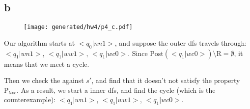 \subsection{b}

\begin{figure}[H]
    \centering
    \texttt{[image: generated/hw4/p4\_c.pdf]}
\end{figure}

Our algorithm starts at $<q_0 | nn1>$, and suppose the outer dfs travels through:
$<q_1 | wn1>$, $<q_1 | ww1>$, $<q_1 | wc0>$.
Since $\text{Post}(<q_1 | wc0>) \setminus \text{R} = \emptyset$, it means that we meet a cycle.

Then we check the against $s'$, and find that it doesn't not satisfy the property $\text{P}_{live}$.
As a result, we start a inner dfs, and find the cycle (which is the counterexample):
$<q_1 | wn1>$, $<q_1 | ww1>$, $<q_1 | wc0>$.
